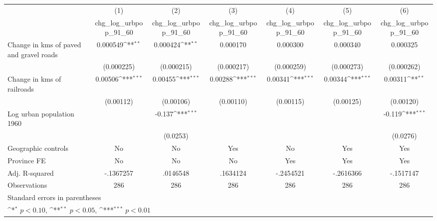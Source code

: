 {
\def\sym#1{\ifmmode^{#1}\else\(^{#1}\)\fi}
\begin{tabular}{l*{6}{c}}
\hline\hline
                    &\multicolumn{1}{c}{(1)}&\multicolumn{1}{c}{(2)}&\multicolumn{1}{c}{(3)}&\multicolumn{1}{c}{(4)}&\multicolumn{1}{c}{(5)}&\multicolumn{1}{c}{(6)}\\
                    &\multicolumn{1}{c}{chg\_log\_urbpop\_91\_60}&\multicolumn{1}{c}{chg\_log\_urbpop\_91\_60}&\multicolumn{1}{c}{chg\_log\_urbpop\_91\_60}&\multicolumn{1}{c}{chg\_log\_urbpop\_91\_60}&\multicolumn{1}{c}{chg\_log\_urbpop\_91\_60}&\multicolumn{1}{c}{chg\_log\_urbpop\_91\_60}\\
\hline
Change in kms of paved and gravel roads&    0.000549\sym{**} &    0.000424\sym{**} &    0.000170         &    0.000300         &    0.000340         &    0.000325         \\
                    &  (0.000225)         &  (0.000215)         &  (0.000217)         &  (0.000259)         &  (0.000273)         &  (0.000262)         \\
[1em]
Change in kms of railroads&     0.00506\sym{***}&     0.00455\sym{***}&     0.00288\sym{***}&     0.00341\sym{***}&     0.00344\sym{***}&     0.00311\sym{**} \\
                    &   (0.00112)         &   (0.00106)         &   (0.00110)         &   (0.00115)         &   (0.00125)         &   (0.00120)         \\
[1em]
Log urban population 1960&                     &      -0.137\sym{***}&                     &                     &                     &      -0.119\sym{***}\\
                    &                     &    (0.0253)         &                     &                     &                     &    (0.0276)         \\
\hline
Geographic controls &          No         &          No         &         Yes         &          No         &         Yes         &         Yes         \\
Province FE         &          No         &          No         &          No         &         Yes         &         Yes         &         Yes         \\
Adj. R-squared      &   -.1367257         &    .0146548         &    .1634124         &   -.2454521         &   -.2616366         &   -.1517147         \\
Observations        &         286         &         286         &         286         &         286         &         286         &         286         \\
\hline\hline
\multicolumn{7}{l}{\footnotesize Standard errors in parentheses}\\
\multicolumn{7}{l}{\footnotesize \sym{*} \(p<0.10\), \sym{**} \(p<0.05\), \sym{***} \(p<0.01\)}\\
\end{tabular}
}
